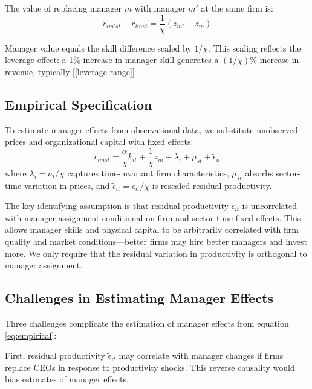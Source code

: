 \documentclass[11pt,a4paper]{article}
\begin{document}
The value of replacing manager $m$ with manager $m'$ at the same firm is:
\begin{equation}\label{eq:manager_value}
r_{im'st} - r_{imst} = \frac{1}{\chi}(z_{m'} - z_{m})
\end{equation}

Manager value equals the skill difference scaled by $1/\chi$. This scaling reflects the leverage effect: a 1\% increase in manager skill generates a $(1/\chi)\%$ increase in revenue, typically [[leverage range]]%

\subsection{Empirical Specification}

To estimate manager effects from observational data, we substitute unobserved prices and organizational capital with fixed effects:
\begin{equation}\label{eq:empirical}
r_{imst} = \frac{\alpha}{\chi} k_{it} + \frac{1}{\chi}z_m + \lambda_i + \mu_{st} + \tilde{\epsilon}_{it}
\end{equation}
where $\lambda_i = a_i/\chi$ captures time-invariant firm characteristics, $\mu_{st}$ absorbs sector-time variation in prices, and $\tilde{\epsilon}_{it} = \epsilon_{it}/\chi$ is rescaled residual productivity.

The key identifying assumption is that residual productivity $\tilde{\epsilon}_{it}$ is uncorrelated with manager assignment conditional on firm and sector-time fixed effects. This allows manager skills and physical capital to be arbitrarily correlated with firm quality and market conditions—better firms may hire better managers and invest more. We only require that the residual variation in productivity is orthogonal to manager assignment.

\subsection{Challenges in Estimating Manager Effects}

Three challenges complicate the estimation of manager effects from equation \eqref{eq:empirical}:

First, residual productivity $\tilde{\epsilon}_{it}$ may correlate with manager changes if firms replace CEOs in response to productivity shocks. This reverse causality would bias estimates of manager effects.
\end{document}
